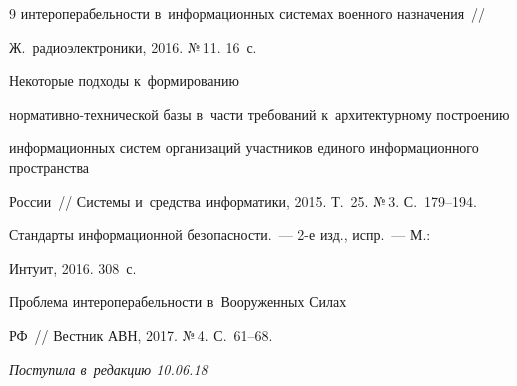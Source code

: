 {{\begin{thebibliography}{9}
интероперабельности в~информационных системах военного назначения~/\!\!/ 

Ж.~радиоэлектроники, 2016. №\,11. 16~с.


 Некоторые подходы к~формированию  

нор\-ма\-тив\-но-тех\-ни\-че\-ской базы в~части требований к~архитектурному построению 

информационных систем организаций участников единого информационного пространства 

России~/\!\!/ Системы и~средства информатики, 2015. Т.~25. №\,3. С.~179--194.


 Стандарты информационной безопасности.~--- 2-е изд., испр.~--- М.: 

Интуит, 2016. 308~с.


 Проблема интероперабельности в~Вооруженных Силах 

РФ~/\!\!/ Вестник АВН, 2017. №\,4. С.~61--68.

        \end{thebibliography}

} }





\vspace*{-6pt}



\hfill{\small\textit{Поступила в~редакцию 10.06.18}}















\vspace*{2pt}



\newpage



\vspace*{-28pt}













